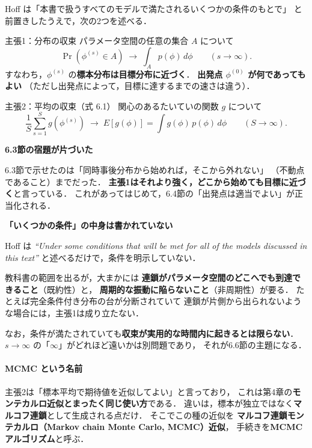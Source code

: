 \documentclass[lualatex,ja=standard,a4paper,12pt]{bxjsarticle}
\begin{document}
Hoff は「本書で扱うすべてのモデルで満たされるいくつかの条件のもとで」
と前置きしたうえで，次の2つを述べる．

\begin{thmbox}{主張1：分布の収束}
パラメータ空間の任意の集合 $A$ について
\[
  \Pr(\phi^{(s)} \in A) \;\longrightarrow\; \int_A p(\phi)\, d\phi
  \qquad (s \to \infty).
\]
すなわち，$\phi^{(s)}$ の\textbf{標本分布は目標分布に近づく}．
\textbf{出発点 $\phi^{(0)}$ が何であってもよい}
（ただし出発点によって，目標に達するまでの速さは違う）．
\end{thmbox}

\begin{thmbox}{主張2：平均の収束（式 6.1）}
関心のあるたいていの関数 $g$ について
\[
  \frac{1}{S}\sum_{s=1}^{S} g(\phi^{(s)})
  \;\longrightarrow\;
  E[g(\phi)] = \int g(\phi)\, p(\phi)\, d\phi
  \qquad (S \to \infty).
\]
\end{thmbox}

\begin{pointbox}
\textbf{6.3節の宿題が片づいた}

6.3節で示せたのは「同時事後分布から始めれば，そこから外れない」
（不動点であること）までだった．
\textbf{主張1はそれより強く，どこから始めても目標に近づく}と言っている．
これがあってはじめて，6.4節の「出発点は適当でよい」が正当化される．
\end{pointbox}

\begin{warningbox}
\textbf{「いくつかの条件」の中身は書かれていない}

Hoff は \textit{``Under some conditions that will be met for all of the
models discussed in this text''} と述べるだけで，条件を明示していない．

\medskip
教科書の範囲を出るが，大まかには
\textbf{連鎖がパラメータ空間のどこへでも到達できること}（既約性）と，
\textbf{周期的な振動に陥らないこと}（非周期性）が要る．
たとえば完全条件付き分布の台が分断されていて
連鎖が片側から出られないような場合には，主張1は成り立たない．

\medskip
なお，条件が満たされていても\textbf{収束が実用的な時間内に起きるとは限らない}．
$s \to \infty$ の「$\infty$」がどれほど遠いかは別問題であり，
それが6.6節の主題になる．
\end{warningbox}

\paragraph{MCMC という名前}
主張2は「標本平均で期待値を近似してよい」と言っており，
これは第4章の\textbf{モンテカルロ近似とまったく同じ使い方}である．
違いは，標本が独立ではなく\textbf{マルコフ連鎖}として生成される点だけ．
そこでこの種の近似を
\textbf{マルコフ連鎖モンテカルロ（Markov chain Monte Carlo, MCMC）近似}，
手続きを\textbf{MCMCアルゴリズム}と呼ぶ．
\end{document}
